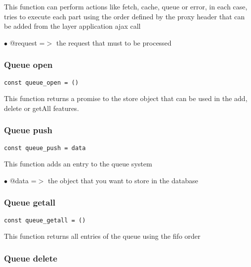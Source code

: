 \documentclass[a4paper]{article}
\begin{document}
This function can perform actions like fetch, cache, queue or error, in each
case, tries to execute each part using the order defined by the proxy header
that can be added from the layer application ajax call

\begin{compactitem}
\item[\color{myblue}$\bullet$] @request =$>$ the request that must to be processed
\end{compactitem}

\hypertarget{toc823}{}
\subsubsection{Queue open}

\begin{lstlisting}
const queue_open = ()
\end{lstlisting}

This function returns a promise to the store object that can be used
in the add, delete or getAll features.

\hypertarget{toc824}{}
\subsubsection{Queue push}

\begin{lstlisting}
const queue_push = data
\end{lstlisting}

This function adds an entry to the queue system

\begin{compactitem}
\item[\color{myblue}$\bullet$] @data =$>$ the object that you want to store in the database
\end{compactitem}

\hypertarget{toc825}{}
\subsubsection{Queue getall}

\begin{lstlisting}
const queue_getall = ()
\end{lstlisting}

This function returns all entries of the queue using the fifo
order

\hypertarget{toc826}{}
\subsubsection{Queue delete}
\end{document}
